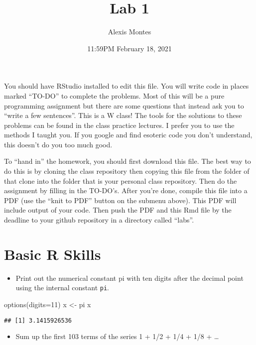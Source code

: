 \documentclass[
]{article}
\title{Lab 1}
\author{Alexis Montes}
\date{11:59PM February 18, 2021}
\newenvironment{Shaded}{\begin{snugshade}}{\end{snugshade}}
\newcommand{\AttributeTok}[1]{\textcolor[rgb]{0.77,0.63,0.00}{#1}}
\newcommand{\DecValTok}[1]{\textcolor[rgb]{0.00,0.00,0.81}{#1}}
\newcommand{\FunctionTok}[1]{\textcolor[rgb]{0.00,0.00,0.00}{#1}}
\newcommand{\NormalTok}[1]{#1}
\newcommand{\OtherTok}[1]{\textcolor[rgb]{0.56,0.35,0.01}{#1}}
\providecommand{\tightlist}{%
  \setlength{\itemsep}{0pt}\setlength{\parskip}{0pt}}
\begin{document}
\maketitle

You should have RStudio installed to edit this file. You will write code
in places marked ``TO-DO'' to complete the problems. Most of this will
be a pure programming assignment but there are some questions that
instead ask you to ``write a few sentences''. This is a W class! The
tools for the solutions to these problems can be found in the class
practice lectures. I prefer you to use the methods I taught you. If you
google and find esoteric code you don't understand, this doesn't do you
too much good.

To ``hand in'' the homework, you should first download this file. The
best way to do this is by cloning the class repository then copying this
file from the folder of that clone into the folder that is your personal
class repository. Then do the assignment by filling in the TO-DO's.
After you're done, compile this file into a PDF (use the ``knit to PDF''
button on the submenu above). This PDF will include output of your code.
Then push the PDF and this Rmd file by the deadline to your github
repository in a directory called ``labs''.

\hypertarget{basic-r-skills}{%
\section{Basic R Skills}\label{basic-r-skills}}

\begin{itemize}
\tightlist
\item
  Print out the numerical constant pi with ten digits after the decimal
  point using the internal constant \texttt{pi}.
\end{itemize}

\begin{Shaded}
\begin{Highlighting}[]
\FunctionTok{options}\NormalTok{(}\AttributeTok{digits=}\DecValTok{11}\NormalTok{)}
\NormalTok{x }\OtherTok{\textless{}{-}}\NormalTok{ pi}
\NormalTok{x}
\end{Highlighting}
\end{Shaded}

\begin{verbatim}
## [1] 3.1415926536
\end{verbatim}

\begin{itemize}
\tightlist
\item
  Sum up the first 103 terms of the series 1 + 1/2 + 1/4 + 1/8 +
  \ldots{}
\end{itemize}
\end{document}
